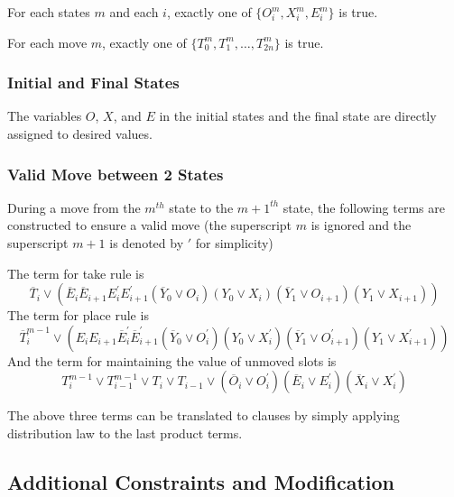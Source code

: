 \documentclass{article}
\begin{document}
        For each states $m$ and each $i$, exactly one of $\{O^m_i, X^m_i, E^m_i\}$ 
        is true.

        For each move $m$, exactly one of $\{T^m_0, T^m_1, \ldots, T^m_{2n}\}$ is true.
        
        \subsubsection{Initial and Final States}

        The variables $O$, $X$, and $E$ in the initial states 
        and the final state are directly assigned to desired values.

        \subsubsection{Valid Move between 2 States}

        During a move from the $m^{th}$ state to the $m+1^{th}$ state,
        the following terms are constructed to ensure a valid move
        (the superscript $m$ is ignored and the superscript $m+1$ is 
        denoted by $\prime$ for simplicity)

        The term for take rule is
        $$
        \overline T_i \lor 
        (
        \overline E_i
        \overline E_{i+1} 
        E_i^\prime E_{i+1}^\prime
        (\overline Y_0\lor O_i)
        (Y_0\lor X_i)
        (\overline Y_1\lor O_{i+1})
        (Y_1\lor X_{i+1})
        )
        $$
        The term for place rule is
        $$
        \overline T_i^{m-1} \lor 
        (
        E_i E_{i+1} 
        \overline E_i^\prime 
        \overline E_{i+1}^\prime
        (\overline Y_0\lor O_i^\prime)
        (Y_0\lor X_i^\prime)
        (\overline Y_1\lor O_{i+1}^\prime)
        (Y_1\lor X_{i+1}^\prime)
        )
        $$
        And the term for maintaining the value of unmoved slots is
        $$
        T_i^{m-1} \lor
        T_{i-1}^{m-1} \lor
        T_i \lor T_{i-1} \lor
        (\overline O_i\lor O_i^\prime)
        (\overline E_i\lor E_i^\prime)
        (\overline X_i\lor X_i^\prime)
        $$


        The above three terms can be translated to clauses by 
        simply applying distribution law to
        the last product terms.
            
    \subsection{Additional Constraints and Modification}
    \label{added}
\end{document}
